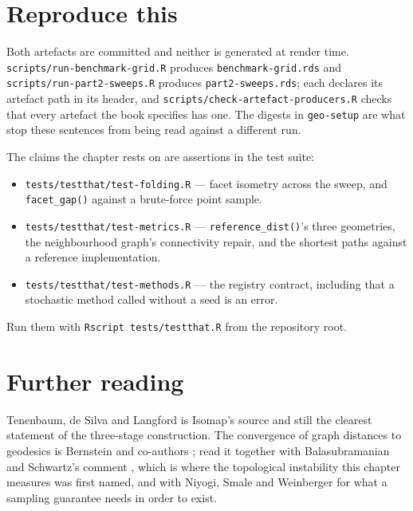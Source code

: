 \documentclass[
  british,
  a4paper,
]{book}
\providecommand{\tightlist}{%
  \setlength{\itemsep}{0pt}\setlength{\parskip}{0pt}}
\begin{document}
\section{Reproduce this}\label{geo-reproduce}

Both artefacts are committed and neither is generated at render time.
\texttt{scripts/run-benchmark-grid.R} produces \texttt{benchmark-grid.rds} and
\texttt{scripts/run-part2-sweeps.R} produces \texttt{part2-sweeps.rds}; each declares its
artefact path in its header, and \texttt{scripts/check-artefact-producers.R} checks that
every artefact the book specifies has one. The digests in \texttt{geo-setup} are what
stop these sentences from being read against a different run.

The claims the chapter rests on are assertions in the test suite:

\begin{itemize}
\tightlist
\item
  \texttt{tests/testthat/test-folding.R} --- facet isometry across the sweep, and
  \texttt{facet\_gap()} against a brute-force point sample.
\item
  \texttt{tests/testthat/test-metrics.R} --- \texttt{reference\_dist()}'s three geometries, the
  neighbourhood graph's connectivity repair, and the shortest paths against a
  reference implementation.
\item
  \texttt{tests/testthat/test-methods.R} --- the registry contract, including that a
  stochastic method called without a seed is an error.
\end{itemize}

Run them with \texttt{Rscript\ tests/testthat.R} from the repository root.

\section{Further reading}\label{geo-reading}

Tenenbaum, de Silva and Langford \citep{tenenbaum2000isomap} is Isomap's source and
still the clearest statement of the three-stage construction. The convergence of
graph distances to geodesics is Bernstein and co-authors
\citep{bernstein2000graph}; read it together with Balasubramanian and Schwartz's
comment \citep{balasubramanian2002isomap}, which is where the topological instability
this chapter measures was first named, and with Niyogi, Smale and Weinberger
\citep{niyogi2008homology} for what a sampling guarantee needs in order to exist.
\end{document}
